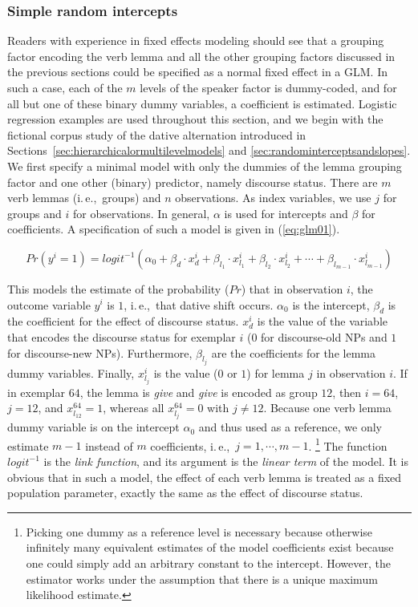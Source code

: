 \documentclass[a4paper,12pt]{article}
\newcommand{\ie}{i.\,e.,\ }
\begin{document}
\subsubsection{Simple random intercepts}
\label{sec:simplerandomintercepts}

Readers with experience in fixed effects modeling should see that a grouping factor encoding the verb lemma and all the other grouping factors discussed in the previous sections could be specified as a normal fixed effect in a GLM.
In such a case, each of the $m$ levels of the speaker factor is dummy-coded, and for all but one of these binary dummy variables, a coefficient is estimated.
Logistic regression examples are used throughout this section, and we begin with the fictional corpus study of the dative alternation introduced in Sections~\ref{sec:hierarchicalormultilevelmodels} and \ref{sec:randominterceptsandslopes}.
We first specify a minimal model with only the dummies of the lemma grouping factor and one other (binary) predictor, namely discourse status.
There are $m$ verb lemmas (\ie groups) and $n$ observations.
As index variables, we use $j$ for groups and $i$ for observations.
In general, $\alpha$ is used for intercepts and $\beta$ for coefficients.
A specification of such a model is given in (\ref{eq:glm01}).

\begin{equation}
  Pr(y^i=1)=logit^{-1}(\alpha_0+\beta_d\cdot x_{d}^i+\beta_{l_1}\cdot x_{l_1}^i+\beta_{l_2}\cdot x_{l_2}^i+\cdots+\beta_{l_{m-1}}\cdot x_{l_{m-1}}^i)
  \label{eq:glm01}
\end{equation}

This models the estimate of the probability ($Pr$) that in observation $i$, the outcome variable $y^i$ is $1$, \ie that dative shift occurs.
$\alpha_0$ is the intercept, $\beta_d$ is the coefficient for the effect of discourse status.
$x_d^i$ is the value of the variable that encodes the discourse status for exemplar $i$ ($0$ for discourse-old NPs and $1$ for discourse-new NPs).
Furthermore, $\beta_{l_j}$ are the coefficients for the lemma dummy variables.
Finally, $x_{l_j}^i$ is the value ($0$ or $1$) for lemma $j$ in observation $i$.
If in exemplar $64$, the lemma is \textit{give} and \textit{give} is encoded as group $12$, then $i=64$, $j=12$, and $x_{l_{12}}^{64}=1$, whereas all $x_{l_j}^{64}=0$ with $j\neq12$.
Because one verb lemma dummy variable is on the intercept $\alpha_0$ and thus used as a reference, we only estimate $m-1$ instead of $m$ coefficients, \ie $j=1,\cdots,m-1$.%
\footnote{Picking one dummy as a reference level is necessary because otherwise infinitely many equivalent estimates of the model coefficients exist because one could simply add an arbitrary constant to the intercept.
However, the estimator works under the assumption that there is a unique maximum likelihood estimate.}
The function $logit^{-1}$ is the \textit{link function}, and its argument is the \textit{linear term} of the model.
It is obvious that in such a model, the effect of each verb lemma is treated as a fixed population parameter, exactly the same as the effect of discourse status.
\end{document}

